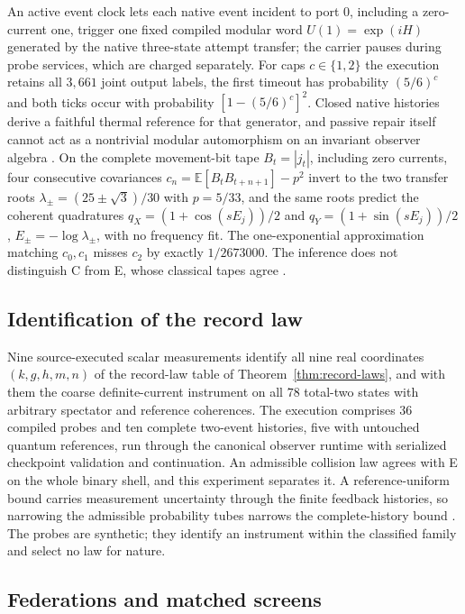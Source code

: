 \documentclass[11pt]{article}
\theoremstyle{definition}
\theoremstyle{remark}
\theoremstyle{plain}
\begin{document}
An active event clock lets each native event incident to port $0$,
including a zero-current one, trigger one fixed compiled modular word
$U(1)=\exp(iH)$ generated by the native three-state attempt transfer; the
carrier pauses during probe services, which are charged separately. For
caps $c\in\{1,2\}$ the execution retains all $3{,}661$ joint output labels,
the first timeout has probability $(5/6)^c$ and both ticks occur with
probability $[1-(5/6)^c]^2$. Closed native histories derive a faithful
thermal reference for that generator, and passive repair itself cannot act
as a nontrivial modular automorphism on an invariant observer algebra
\cite{nativeEventClock}. On the complete movement-bit tape
$B_t=|j_t|$, including zero currents, four consecutive covariances
$c_n=\mathbb E[B_tB_{t+n+1}]-p^2$ invert to the two transfer roots
$\lambda_\pm=(25\pm\sqrt3)/30$ with $p=5/33$, and the same roots predict the
coherent quadratures $q_X=(1+\cos(sE_j))/2$ and $q_Y=(1+\sin(sE_j))/2$,
$E_\pm=-\log\lambda_\pm$, with no frequency fit. The one-exponential
approximation matching $c_0,c_1$ misses $c_2$ by exactly $1/2673000$. The
inference does not distinguish C from E, whose classical tapes agree
\cite{nativePredictions}.

\subsection{Identification of the record law}
\label{sec:identification}

Nine source-executed scalar measurements identify all nine real coordinates
$(k,g,h,m,n)$ of the record-law table of Theorem~\ref{thm:record-laws}, and
with them the coarse definite-current instrument on all $78$ total-two
states with arbitrary spectator and reference coherences. The execution
comprises $36$ compiled probes and ten complete two-event histories, five
with untouched quantum references, run through the canonical observer
runtime with serialized checkpoint validation and continuation. An
admissible collision law agrees with E on the whole binary shell, and this
experiment separates it. A reference-uniform bound carries measurement
uncertainty through the finite feedback histories, so narrowing the
admissible probability tubes narrows the complete-history bound
\cite{nativeIdentification}. The probes are synthetic; they identify an
instrument within the classified family and select no law for nature.

\subsection{Federations and matched screens}
\label{sec:screens}
\end{document}
